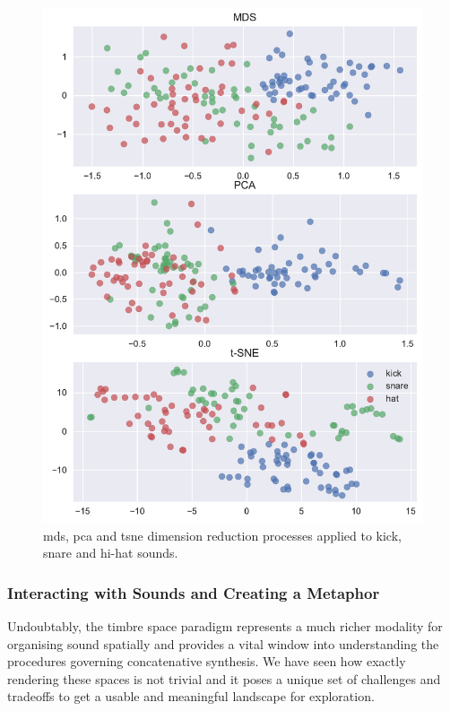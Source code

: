 \begin{figure}
	\begin{center}
		\includegraphics[width=1.0\textwidth]{ch06_rhythmcat/figures/dimension_reductions.pdf}
	\end{center}
	\caption[MDS, PCA and t-SNE Dimension Reduction on kick,snare and hat sounds]{\acrshort{mds}, \acrshort{pca} and \acrshort{tsne} dimension reduction processes applied to kick, snare and hi-hat sounds.}
	\label{fig:dimension_reductions}
\end{figure}

\subsubsection{Interacting with Sounds and Creating a Metaphor}

\label{sec:interact_metaphor}

Undoubtably, the timbre space paradigm represents a much richer modality for organising sound spatially and provides a vital window into understanding the procedures governing concatenative synthesis. We have seen how exactly rendering these spaces is not trivial and it poses a unique set of challenges and tradeoffs to get a usable and meaningful landscape for exploration.

